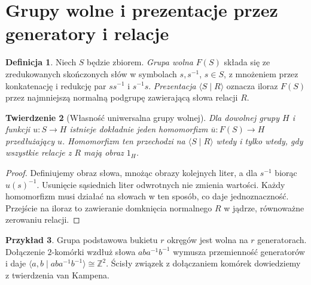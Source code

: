 \documentclass[11pt,a4paper,oneside]{report}
\newcommand{\Z}{\mathbb{Z}}
\theoremstyle{plain}
\newtheorem{twierdzenie}{Twierdzenie}[section]
\theoremstyle{definition}
\newtheorem{definicja}[twierdzenie]{Definicja}
\newtheorem{przyklad}[twierdzenie]{Przykład}
\theoremstyle{remark}
\begin{document}
\section{Grupy wolne i prezentacje przez generatory i relacje}
\begin{definicja}
Niech $S$ będzie zbiorem. \emph{Grupa wolna} $F(S)$ składa się ze
zredukowanych skończonych słów w symbolach $s,s^{-1}$, $s\in S$,
z mnożeniem przez konkatenację i redukcję par $ss^{-1}$ i $s^{-1}s$.
\emph{Prezentacja} $\langle S\mid R\rangle$ oznacza iloraz $F(S)$
przez najmniejszą normalną podgrupę zawierającą słowa relacji $R$.
\end{definicja}
\begin{twierdzenie}[Własność uniwersalna grupy wolnej]
Dla dowolnej grupy $H$ i funkcji $u:S\to H$ istnieje dokładnie
jeden homomorfizm $\overline u:F(S)\to H$ przedłużający $u$.
Homomorfizm ten przechodzi na $\langle S\mid R\rangle$ wtedy
i tylko wtedy, gdy wszystkie relacje z $R$ mają obraz $1_H$.
\end{twierdzenie}
\begin{proof}
Definiujemy obraz słowa, mnożąc obrazy kolejnych liter,
a dla $s^{-1}$ biorąc $u(s)^{-1}$. Usunięcie sąsiednich
liter odwrotnych nie zmienia wartości. Każdy homomorfizm
musi działać na słowach w ten sposób, co daje jednoznaczność.
Przejście na iloraz to zawieranie domknięcia normalnego $R$
w jądrze, równoważne zerowaniu relacji.
\end{proof}
\begin{przyklad}
Grupa podstawowa bukietu $r$ okręgów jest wolna na $r$
generatorach. Dołączenie $2$-komórki wzdłuż słowa
$aba^{-1}b^{-1}$ wymusza przemienność generatorów i daje
$\langle a,b\mid aba^{-1}b^{-1}\rangle\cong\Z^2$.
Ścisły związek z dołączaniem komórek dowiedziemy z twierdzenia
van Kampena.
\end{przyklad}
\end{document}
